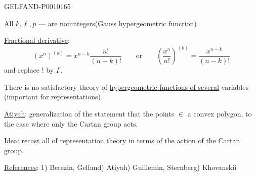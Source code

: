 \begin{GelfandAdjacentEvidence}{GELFAND-P001016}{5}


All $k,\ell,p$ --- \underline{are nonintegers}\qquad (Gauss hypergeometric function)

\underline{Fractional derivative}:
\[
(x^n)^{(k)}=x^{n-k}\frac{n!}{(n-k)!}
\qquad\text{or}\qquad
\left(\frac{x^n}{n!}\right)^{(k)}=\frac{x^{n-k}}{(n-k)!}
\]
and replace $!$ by $\Gamma$.

There is no satisfactory theory of \underline{hypergeometric functions of several} variables (important for representations)

\underline{Atiyah}: generalization of the statement that the points $\in$ a convex polygon, to the case where only the Cartan group acts.

Idea: recast all of representation theory in terms of the action of the Cartan group.

\underline{References}: 1) Berezin, Gelfand) Atiyah) Guillemin, Sternberg) Khovanskii

\end{GelfandAdjacentEvidence}



